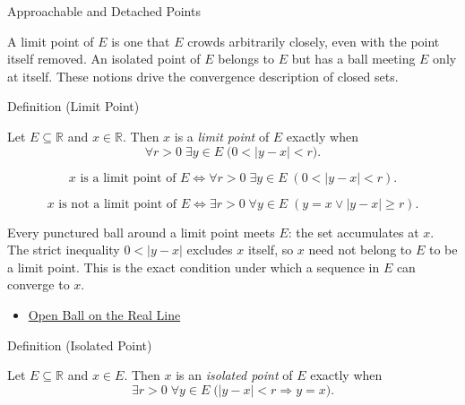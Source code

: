 \label{sec:limit-and-isolated-points}

\begin{topicbox}{Approachable and Detached Points}
\begin{exposition}
A limit point of $E$ is one that $E$ crowds arbitrarily closely, even with the point itself removed. An isolated point of $E$ belongs to $E$ but has a ball meeting $E$ only at itself. These notions drive the convergence description of closed sets.
\end{exposition}
\end{topicbox}
\begin{definitionbox}{Definition (Limit Point)}
\begin{definition}
\label{def:limit-point}
Let $E\subseteq\mathbb{R}$ and $x\in\mathbb{R}$. Then $x$ is a \emph{limit point} of $E$ exactly when
\[
\forall r>0\;\exists y\in E\;\bigl(0<|y-x|<r\bigr).
\]
\end{definition}
\end{definitionbox}
\begin{remark*}
\[
x \text{ is a limit point of } E \Longleftrightarrow \forall r>0\;\exists y\in E\;(0<|y-x|<r).
\]
\end{remark*}
\begin{remark*}
\[
x \text{ is not a limit point of } E \Longleftrightarrow \exists r>0\;\forall y\in E\;(y=x \lor |y-x|\ge r).
\]
\end{remark*}
\begin{remark*}[Interpretation]
Every punctured ball around a limit point meets $E$: the set accumulates at $x$. The strict inequality $0<|y-x|$ excludes $x$ itself, so $x$ need not belong to $E$ to be a limit point. This is the exact condition under which a sequence in $E$ can converge to $x$.
\end{remark*}
\begin{dependencies}
\begin{itemize}
  \item \hyperref[def:open-ball]{Open Ball on the Real Line}
\end{itemize}
\end{dependencies}
\begin{definitionbox}{Definition (Isolated Point)}
\begin{definition}
\label{def:isolated-point}
Let $E\subseteq\mathbb{R}$ and $x\in E$. Then $x$ is an \emph{isolated point} of $E$ exactly when
\[
\exists r>0\;\forall y\in E\;\bigl(|y-x|<r \Rightarrow y=x\bigr).
\]
\end{definition}
\end{definitionbox}
